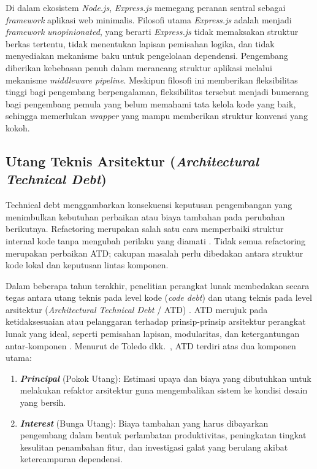 \documentclass[12pt,a4paper,oneside]{report}
\begin{document}
Di dalam ekosistem \textit{Node.js}, \textit{Express.js} memegang peranan sentral sebagai \textit{framework} aplikasi web minimalis. Filosofi utama \textit{Express.js} adalah menjadi \textit{framework} \textit{unopinionated}, yang berarti \textit{Express.js} tidak memaksakan struktur berkas tertentu, tidak menentukan lapisan pemisahan logika, dan tidak menyediakan mekanisme baku untuk pengelolaan dependensi. Pengembang diberikan kebebasan penuh dalam merancang struktur aplikasi melalui mekanisme \textit{middleware pipeline}. Meskipun filosofi ini memberikan fleksibilitas tinggi bagi pengembang berpengalaman, fleksibilitas tersebut menjadi bumerang bagi pengembang pemula yang belum memahami tata kelola kode yang baik, sehingga memerlukan \textit{wrapper} yang mampu memberikan struktur konvensi yang kokoh.

\subsection{Utang Teknis Arsitektur (\textit{Architectural Technical Debt})}

Technical debt menggambarkan konsekuensi keputusan pengembangan yang menimbulkan kebutuhan perbaikan atau biaya tambahan pada perubahan berikutnya. Refactoring merupakan salah satu cara memperbaiki struktur internal kode tanpa mengubah perilaku yang diamati \cite{fowler2018refactoring}. Tidak semua refactoring merupakan perbaikan ATD; cakupan masalah perlu dibedakan antara struktur kode lokal dan keputusan lintas komponen.

Dalam beberapa tahun terakhir, penelitian perangkat lunak membedakan secara tegas antara utang teknis pada level kode (\textit{code debt}) dan utang teknis pada level arsitektur (\textit{Architectural Technical Debt} / ATD) \cite{sousa2023atd}. ATD merujuk pada ketidaksesuaian atau pelanggaran terhadap prinsip-prinsip arsitektur perangkat lunak yang ideal, seperti pemisahan lapisan, modularitas, dan ketergantungan antar-komponen \cite{verdecchia2021theory}. Menurut de Toledo dkk.\ \cite{toledo2021identifying,toledo2022accumulation}, ATD terdiri atas dua komponen utama:
\begin{enumerate}
    \item \textbf{\textit{Principal}} (Pokok Utang): Estimasi upaya dan biaya yang dibutuhkan untuk melakukan refaktor arsitektur guna mengembalikan sistem ke kondisi desain yang bersih.
    \item \textbf{\textit{Interest}} (Bunga Utang): Biaya tambahan yang harus dibayarkan pengembang dalam bentuk perlambatan produktivitas, peningkatan tingkat kesulitan penambahan fitur, dan investigasi galat yang berulang akibat ketercampuran dependensi.
\end{enumerate}
\end{document}
